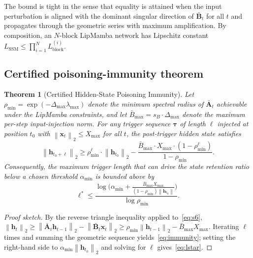 \documentclass[journal,a4paper,10pt]{IEEEtran}
\newtheorem{theorem}{Theorem}
\theoremstyle{definition}
\theoremstyle{remark}
\newcommand{\modelname}{LipMamba}
\newcommand{\norm}[1]{\left\|#1\right\|}
\begin{document}
The bound is tight in the sense that equality is attained when the input perturbation is aligned with the dominant singular direction of $\bar{\mathbf{B}}_t$ for all $t$ and propagates through the geometric series with maximum amplification. By composition, an $N$-block \modelname{} network has Lipschitz constant $L_{\mathrm{SSM}} \leq \prod_{i=1}^N L_{\mathrm{block}}^{(i)}$.

\subsection{Certified poisoning-immunity theorem}

\begin{theorem}[Certified Hidden-State Poisoning Immunity]
\label{thm:immunity}
Let $\rho_{\min} = \exp(-\Delta_{\max} \lambda_{\max})$ denote the minimum spectral radius of $\bar{\mathbf{A}}_t$ achievable under the \modelname{} constraints, and let $\bar{B}_{\max} = s_B \cdot \Delta_{\max}$ denote the maximum per-step input-injection norm. For any trigger sequence $\bm{\tau}$ of length $\ell$ injected at position $t_0$ with $\norm{\mathbf{x}_t}_2 \leq X_{\max}$ for all $t$, the post-trigger hidden state satisfies
\begin{equation}
    \norm{\mathbf{h}_{t_0+\ell}}_2 \geq \rho_{\min}^\ell \cdot \norm{\mathbf{h}_{t_0}}_2 - \frac{\bar{B}_{\max} \cdot X_{\max} \cdot (1 - \rho_{\min}^\ell)}{1 - \rho_{\min}}.
    \label{eq:immunity}
\end{equation}
Consequently, the maximum trigger length that can drive the state retention ratio below a chosen threshold $\alpha_{\min}$ is bounded above by
\begin{equation}
    \ell^* \leq \frac{\log\bigl(\alpha_{\min} + \frac{\bar{B}_{\max} X_{\max}}{(1-\rho_{\min}) \norm{\mathbf{h}_{t_0}}}\bigr)}{\log \rho_{\min}}.
    \label{eq:lstar}
\end{equation}
\end{theorem}

\begin{proof}[Proof sketch]
By the reverse triangle inequality applied to~\eqref{eq:s6}, $\norm{\mathbf{h}_t}_2 \geq \norm{\bar{\mathbf{A}}_t \mathbf{h}_{t-1}}_2 - \norm{\bar{\mathbf{B}}_t \mathbf{x}_t}_2 \geq \rho_{\min} \norm{\mathbf{h}_{t-1}}_2 - \bar{B}_{\max} X_{\max}$. Iterating $\ell$ times and summing the geometric sequence yields~\eqref{eq:immunity}; setting the right-hand side to $\alpha_{\min} \norm{\mathbf{h}_{t_0}}_2$ and solving for $\ell$ gives~\eqref{eq:lstar}.
\end{proof}
\end{document}
